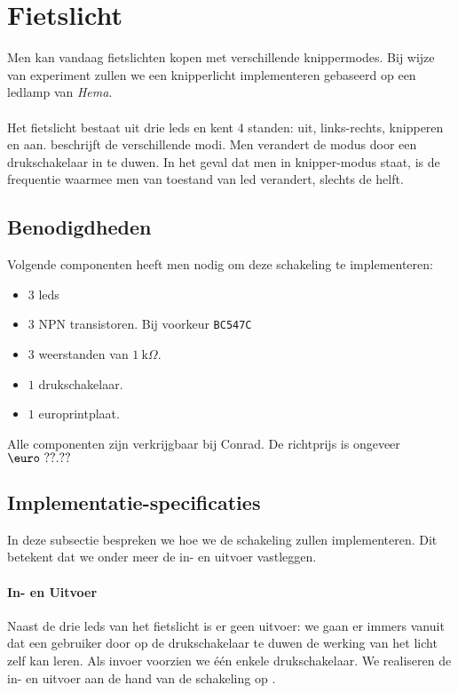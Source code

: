 \section{Fietslicht}
Men kan vandaag fietslichten kopen met verschillende knippermodes. Bij wijze van experiment zullen we een knipperlicht implementeren gebaseerd op een ledlamp van \emph{Hema}.
\paragraph{}
Het fietslicht bestaat uit drie leds en kent 4 standen: uit, links-rechts, knipperen en aan.  beschrijft de verschillende modi. Men verandert de modus door een drukschakelaar in te duwen. In het geval dat men in knipper-modus staat, is de frequentie waarmee men van toestand van led verandert, slechts de helft.
\subsection{Benodigdheden}
Volgende componenten heeft men nodig om deze schakeling te implementeren:
\begin{itemize}
 \item $3$ leds
 \item $3$ NPN transistoren. Bij voorkeur \verb+BC547C+
 \item $3$ weerstanden van $1~\mbox{k}\Omega$.
 \item $1$ drukschakelaar.
 \item $1$ europrintplaat.
\end{itemize}
Alle componenten zijn verkrijgbaar bij Conrad. De richtprijs is ongeveer $\mbox{\euro}\ ??.??$
\subsection{Implementatie-specificaties}
In deze subsectie bespreken we hoe we de schakeling zullen implementeren. Dit betekent dat we onder meer de in- en uitvoer vastleggen.
\paragraph{In- en Uitvoer}
Naast de drie leds van het fietslicht is er geen uitvoer: we gaan er immers vanuit dat een gebruiker door op de drukschakelaar te duwen de werking van het licht zelf kan leren. Als invoer voorzien we \'e\'en enkele drukschakelaar. We realiseren de in- en uitvoer aan de hand van de schakeling op .
